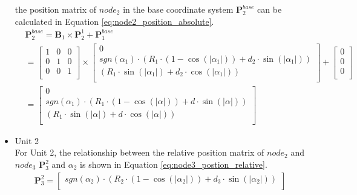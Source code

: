 \begin{itemize}
    the position matrix of $node_{2}$ in the base coordinate system $\textbf{P}_{2}^{base}$ can be calculated in Equation \ref{eq:node2_position_absolute}.
    \begin{align}
        &\textbf{P}_{2}^{base} = \textbf{B}_{1} \times \textbf{P}_{2}^{1} + \textbf{P}_{1}^{base} \nonumber \\
        &=
        \begin{bmatrix}
            1 & 0 & 0 \\
            0 & 1 & 0 \\
            0 & 0 & 1 \\
        \end{bmatrix}
        \times
        \begin{bmatrix}
            0 \\
            sgn(\alpha_1)\cdot(R_1\cdot(1-\cos(\left|\alpha_1\right|)) + d_2\cdot \sin(\left|\alpha_1\right|)) \\
            (R_1\cdot \sin(\left|\alpha_1\right|) + d_2\cdot \cos(\left|\alpha_1\right|)) \\
        \end{bmatrix}
        +
        \begin{bmatrix}
            0 \\
            0 \\
            0 \\
        \end{bmatrix} \nonumber \\
        &=
        \begin{bmatrix}
            0 \\
            sgn(\alpha_1)\cdot(R_1\cdot(1-\cos(\left|\alpha\right|)) + d\cdot \sin(\left|\alpha\right|)) \\
            (R_1\cdot \sin(\left|\alpha\right|) + d\cdot \cos(\left|\alpha\right|)) \\
        \end{bmatrix}
        \label{eq:node2_position_absolute}
    \end{align}
    \item Unit 2 \\
    For Unit 2, the relationship between the relative position matrix of $node_2$ and $node_3$ $\textbf{P}_{3}^{2}$ and 
    $\alpha_2$ is shown in Equation \ref{eq:node3_postion_relative}.
    \begin{align}
        \textbf{P}_{3}^{2} = 
        \begin{bmatrix}
            sgn(\alpha_2)\cdot(R_2\cdot(1-\cos(\left|\alpha_2\right|)) + d_3\cdot \sin(\left|\alpha_2\right|)) \\

\end{bmatrix}
\end{align}
\end{itemize}
